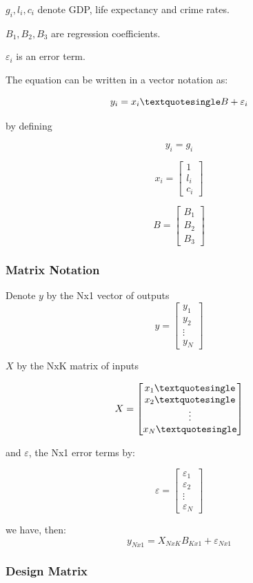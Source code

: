 \documentclass{article} %
\begin{document}
\(g_i, l_i, c_i\) denote GDP, life expectancy and crime rates.


\(B_1, B_2, B_3\) are regression coefficients.


\(\varepsilon_i\) is an error term.

The equation can be written in a vector notation as:

\[y_i = x_i\textquotesingle B + \varepsilon_i\]

by defining


\[y_i = g_i\]

\[x_i = \begin{bmatrix} 1 \\ l_i\\ c_i \end{bmatrix}\]

\[B = \begin{bmatrix} B_1\\B_2\\B_3\end{bmatrix}\]

\subsubsection{Matrix Notation}


Denote \(y\) by the Nx1 vector of outputs 
\[y= \begin{bmatrix} y_1\\y_2\\ \vdots\\y_N\end{bmatrix}\]

\(X\) by the NxK matrix of inputs

\[X = \begin{bmatrix} x_1\textquotesingle\\x_2\textquotesingle\\\vdots\\x_N\textquotesingle\end{bmatrix}\]

and \(\varepsilon\), the Nx1 error terms by:

\[\varepsilon = \begin{bmatrix} \varepsilon_1\\\varepsilon_2\\\vdots\\\varepsilon_N\end{bmatrix}\]

we have, then:
\[y_{Nx1} = X_{NxK}B_{Kx1} + \varepsilon_{Nx1}\]

\subsubsection{Design Matrix}
\end{document}

